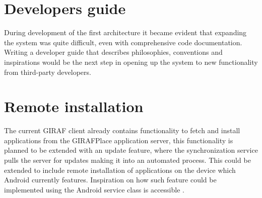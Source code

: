 

\section{Developers guide}
During development of the first architecture it became evident that expanding the system was quite difficult, even with comprehensive code documentation. Writing a developer guide that describes philosophies, conventions and inspirations would be the next step in opening up the system to new functionality from third-party developers.

\section{Remote installation}
The current GIRAF client already contains functionality to fetch and install applications from the GIRAFPlace application server, this functionality is planned to be extended with an update feature, where the synchronization service pulls the server for updates making it into an automated process. This could be extended to include remote installation of applications on the device which Android currently features. Inspiration on how such feature could be implemented using the Android service class is accessible \cite{DevRemote}. 